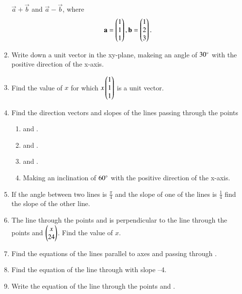 \begin{enumerate}[label=\arabic*.,ref=\thesubsection.\theenumi]
$\vec{a}+\vec{b}$ and $\vec{a}-\vec{b}$, where 
\begin{align}
\mathbf{a}=\begin{pmatrix}1\\1\\1\end{pmatrix},
\mathbf{b}=\begin{pmatrix}1\\2\\3\end{pmatrix}.
\end{align}
\item Write down a unit vector in the xy-plane, makeing an angle of $30\degree$ with the positive direction of the x-axis.
\item Find the value of $x$ for which $x\begin{pmatrix}1\\1\\1\end{pmatrix}$ is a unit vector.
\item Find the direction vectors and slopes of the lines passing through the points
%
\begin{enumerate}
\item {} and .
\item {} and .
\item {} and .
\item Making an inclination of $60\degree$ with the positive direction of the x-axis.
\end{enumerate}
%
\item If the angle between two lines is $\frac{\pi}{4}$ and the slope of one of the lines is $\frac{1}{4}$ find the slope of the other line.
\item The line through the points  and  is perpendicular to the line through the points  and $\begin{pmatrix}x\\24\end{pmatrix}$.  Find the value of $x$.
\item Find the equations of the lines parallel to axes and passing through .
\item Find the equation of the line through  with slope –4.
\item Write the equation of the line through the points  and .

\end{enumerate}
